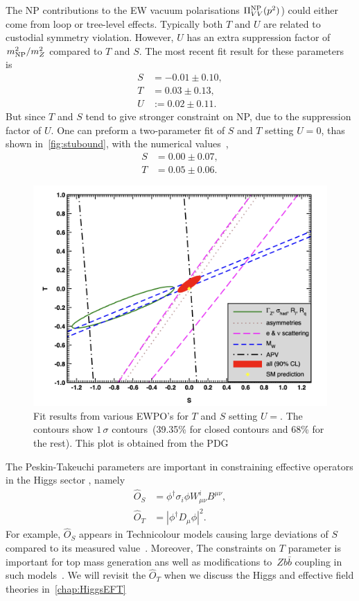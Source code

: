 The NP contributions to the EW vacuum polarisations $\Pi_{VV}^{\mathrm{NP}}(p^2)$) could either come from loop or tree-level effects. Typically both $T$ and $U$ are related to custodial symmetry violation. However, $U$ has an extra suppression factor of $m_{\mathrm{NP}}^2/m_Z^2$ compared to $T$ and $S$. The most recent fit result for these parameters is~\cite{Zyla:2020zbs}
\begin{align}
	S &=-0.01\pm0.10,  \nonumber \\
	T &= 0.03\pm0.13, \\
	U&:= 0.02\pm0.11.\nonumber 
\end{align}
But since $T$ and $S$ tend to give stronger constraint on NP, due to the suppression factor of $U$. One can preform a two-parameter fit of $S$ and $T$ setting $U=0$, thas shown in~\autoref{fig:stubound}, with the numerical values~\cite{Zyla:2020zbs}, \\
 \begin{align}
 	S &=0.00\pm0.07,  \nonumber \\
 	T &= 0.05\pm0.06.
 \end{align}
\begin{figure}[t]
	\centering
	\includegraphics[width=0.65\linewidth]{./figures/stu-pdg}
	\caption{ Fit results from various EWPO's for $T$ and $S$ setting $U=$. The contours show $1\,\sigma$ contours~(39.35\% for closed contours and 68\% for the rest). This plot is obtained from the PDG~\cite{Zyla:2020zbs}  }  \label{fig:stubound}
\end{figure}
The Peskin-Takeuchi parameters are important in constraining effective operators in the Higgs sector , namely
 \begin{align}
 \hat{O}_S &= \phi^\dagger \sigma_i \phi W^i_{\mu \nu} B^{\mu \nu}, \nonumber \\
\hat{O}_T &= |\phi^\dagger D_\mu \phi|^2.
\end{align}
For example, $\hat{O}_S$ appears in Technicolour models causing large deviations of $S$ compared to its measured value~\cite{GOLDEN19913,HOLDOM199088,ALTARELLI19923,PhysRevLett.65.964}. Moreover, The constraints on $T$ parameter is important for top mass generation ans well as modifications to~$Z  b \bar{b}$ coupling in such models~\cite{PhysRevLett.69.575,Simmons:1995df}. We will revisit the $\hat{O}_T$ when we discuss the Higgs and effective field theories in~\autoref{chap:HiggsEFT}
